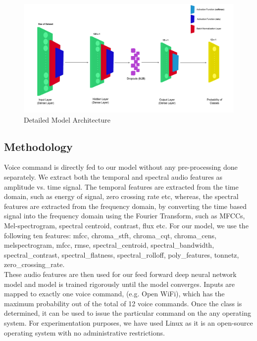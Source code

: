 \documentclass[conference]{IEEEtran}
\begin{document}
\begin{figure}[h!]
  \includegraphics[width=\linewidth]{figure-modelArchitecture.png}
  \caption{Detailed Model Architecture}
  \label{figure-modelArchitecture}
\end{figure} 

\subsection{Methodology}
Voice command is directly fed to our model without any pre-processing done separately. We extract both the temporal and spectral audio features as amplitude vs. time signal. The temporal features are extracted from the time domain, such as energy of signal, zero crossing rate etc, whereas, the spectral features are extracted from the frequency domain, by converting the time based signal into the frequency domain using the Fourier Transform, such as MFCCs, Mel-spectrogram, spectral centroid, contrast, flux etc. For our model, we use the following ten features: mfcc, chroma\_stft,  chroma\_cqt, chroma\_cens, melspectrogram, mfcc, rmse, spectral\_centroid, spectral\_bandwidth, spectral\_contrast, spectral\_flatness, spectral\_rolloff, poly\_features, tonnetz, zero\_crossing\_rate.\\

These audio features are then used for our feed forward deep neural network model and model is trained rigorously until the model converges. Inputs are mapped to exactly one voice command, (e.g. Open WiFi), which has the maximum probability out of the total of 12 voice commands. Once the class is determined, it can be used to issue the particular command on the any operating system. For experimentation purposes, we have used Linux as it is an open-source operating system with no administrative restrictions.
\end{document}
